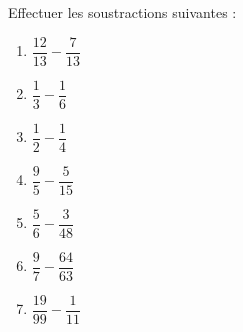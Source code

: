 
\begin{exercice}\label{exosmath-0871}

    Effectuer les soustractions suivantes :
    \begin{multicols}{3}
        \begin{enumerate}
            \item
                \( \dfrac{  12  }{ 13 }-\dfrac{  7  }{ 13 }\) 
            \item
                \( \dfrac{  1  }{ 3 }-\dfrac{  1  }{ 6 }\) 
            \item
                \( \dfrac{  1  }{ 2 }-\dfrac{  1  }{ 4 }\) 
            \item
                \( \dfrac{  9  }{5 }-\dfrac{  5  }{ 15 }\) 
            \item
                \( \dfrac{  5  }{ 6 }-\dfrac{  3  }{ 48 }\) 
            \item
                \( \dfrac{  9  }{ 7 }-\dfrac{  64  }{ 63 }\) 
            \item
                \( \dfrac{  19  }{ 99 }-\dfrac{  1  }{ 11 }\) 
        \end{enumerate}
    \end{multicols}

\end{exercice}
